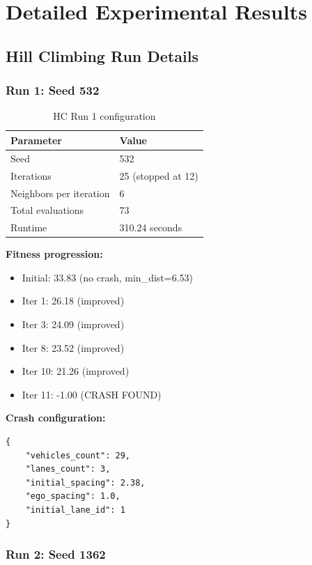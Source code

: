 \section{Detailed Experimental Results}

\subsection{Hill Climbing Run Details}

\subsubsection{Run 1: Seed 532}

\begin{table}[H]
\centering
\begin{tabular}{|l|l|}
\hline
\textbf{Parameter} & \textbf{Value} \\
\hline
Seed & 532 \\
Iterations & 25 (stopped at 12) \\
Neighbors per iteration & 6 \\
Total evaluations & 73 \\
Runtime & 310.24 seconds \\
\hline
\end{tabular}
\caption{HC Run 1 configuration}
\end{table}

\textbf{Fitness progression:}
\begin{itemize}
    \item Initial: 33.83 (no crash, min\_dist=6.53)
    \item Iter 1: 26.18 (improved)
    \item Iter 3: 24.09 (improved)
    \item Iter 8: 23.52 (improved)
    \item Iter 10: 21.26 (improved)
    \item Iter 11: -1.00 (CRASH FOUND)
\end{itemize}

\textbf{Crash configuration:}
\begin{verbatim}
{
    "vehicles_count": 29,
    "lanes_count": 3,
    "initial_spacing": 2.38,
    "ego_spacing": 1.0,
    "initial_lane_id": 1
}
\end{verbatim}

\subsubsection{Run 2: Seed 1362}

